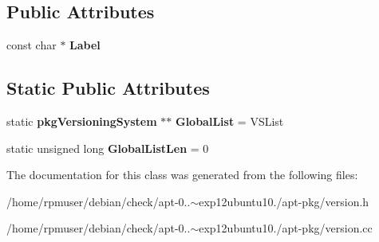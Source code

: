 \subsection*{\-Public \-Attributes}
\begin{DoxyCompactItemize}
\item 
const char $\ast$ {\bfseries \-Label}\label{classpkgVersioningSystem_a2c28600dbc88e9535c6e44b111829cc2}

\end{DoxyCompactItemize}
\subsection*{\-Static \-Public \-Attributes}
\begin{DoxyCompactItemize}
\item 
static {\bf pkg\-Versioning\-System} $\ast$$\ast$ {\bfseries \-Global\-List} = \-V\-S\-List\label{classpkgVersioningSystem_a10ad0ee37c2b6d25736b4c604b9f7fb5}

\item 
static unsigned long {\bfseries \-Global\-List\-Len} = 0\label{classpkgVersioningSystem_acdd1750df964c2a94afe622abfe15d7b}

\end{DoxyCompactItemize}


\-The documentation for this class was generated from the following files\-:\begin{DoxyCompactItemize}
\item 
/home/rpmuser/debian/check/apt-\/0..$\sim$exp12ubuntu10./apt-\/pkg/version.\-h\item 
/home/rpmuser/debian/check/apt-\/0..$\sim$exp12ubuntu10./apt-\/pkg/version.\-cc\end{DoxyCompactItemize}
